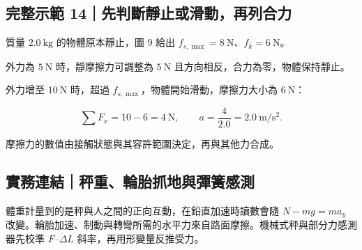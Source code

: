 \documentclass[11pt,a4paper]{article}
\begin{document}
\begin{HandoutWorkedExample}

\subsection{完整示範 14｜先判斷靜止或滑動，再列合力}\label{ux5b8cux6574ux793aux7bc4-14ux5148ux5224ux65b7ux975cux6b62ux6216ux6ed1ux52d5ux518dux5217ux5408ux529b}

質量 \(2.0\ \mathrm{kg}\) 的物體原本靜止，圖 9 給出 \(f_{s,\max}=8\ \mathrm N\)、\(f_k=6\ \mathrm N\)。

外力為 \(5\ \mathrm N\) 時，靜摩擦力可調整為 \(5\ \mathrm N\) 且方向相反，合力為零，物體保持靜止。

外力增至 \(10\ \mathrm N\) 時，超過 \(f_{s,\max}\)，物體開始滑動，摩擦力大小為 \(6\ \mathrm N\)：

\[
\sum F_x=10-6=4\ \mathrm N,
\qquad
a=\frac{4}{2.0}=2.0\ \mathrm{m/s^2}.
\]

摩擦力的數值由接觸狀態與其容許範圍決定，再與其他力合成。

\end{HandoutWorkedExample}

\subsection{實務連結｜秤重、輪胎抓地與彈簧感測}\label{ux5be6ux52d9ux9023ux7d50ux79e4ux91cdux8f2aux80ceux6293ux5730ux8207ux5f48ux7c27ux611fux6e2c}

體重計量到的是秤與人之間的正向互動，在鉛直加速時讀數會隨 \(N-mg=ma_y\) 改變。輪胎加速、制動與轉彎所需的水平力來自路面摩擦。機械式秤與部分力感測器先校準 \(F\)--\(\Delta L\) 斜率，再用形變量反推受力。
\end{document}
